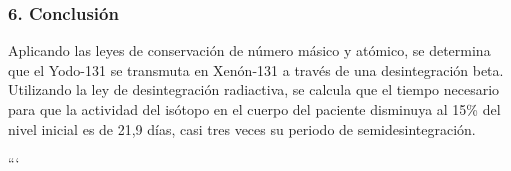 \subsubsection*{6. Conclusión}
\begin{cajaconclusion}
    Aplicando las leyes de conservación de número másico y atómico, se determina que el Yodo-131 se transmuta en Xenón-131 a través de una desintegración beta. Utilizando la ley de desintegración radiactiva, se calcula que el tiempo necesario para que la actividad del isótopo en el cuerpo del paciente disminuya al 15\% del nivel inicial es de 21,9 días, casi tres veces su periodo de semidesintegración.
\end{cajaconclusion}

\newpage
```
